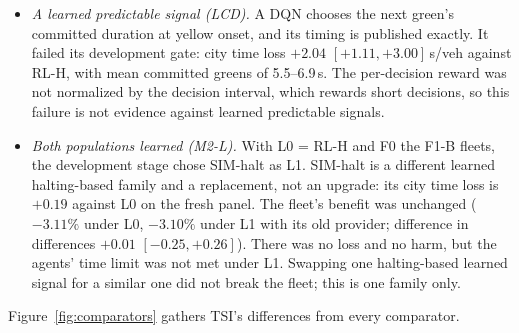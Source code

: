 \documentclass[11pt]{article}
\begin{document}
\begin{itemize}
\item \emph{A learned predictable signal (LCD).} A DQN chooses the next green's committed duration at yellow onset, and its timing is
published exactly. It failed its development gate: city time loss $+2.04$ $[+1.11,+3.00]$\,s/veh against RL-H, with mean committed greens
of 5.5--6.9\,s. The per-decision reward was not normalized by the decision interval, which rewards short decisions, so this failure is not
evidence against learned predictable signals.
\item \emph{Both populations learned (M2-L).} With L0 = RL-H and F0 the F1-B fleets, the development stage chose SIM-halt as L1. SIM-halt
is a different learned halting-based family and a replacement, not an upgrade: its city time loss is $+0.19$ against L0 on the fresh panel.
The fleet's benefit was unchanged ($-3.11\%$ under L0, $-3.10\%$ under L1 with its old provider; difference in differences $+0.01$
$[-0.25,+0.26]$). There was no loss and no harm, but the agents' time limit was not met under L1. Swapping one halting-based learned signal
for a similar one did not break the fleet; this is one family only.
\end{itemize}
Figure~\ref{fig:comparators} gathers TSI's differences from every comparator.
\begin{table}[t]\centering\small
\caption{Wave 6 on the third grid4 panel (760--779; t4--t8 $\times$ four fleets $\times$ 20) and spider attempt 3. Agent fuel (\%) and time
losses (s/veh) against R, with one-sided 95\% upper bounds in parentheses (98.75\% for spider attempt 3). ``Meets'' means all M3 limits,
including teleports and unfinished trips.}\label{tab:w6}
\end{table}
\end{document}
